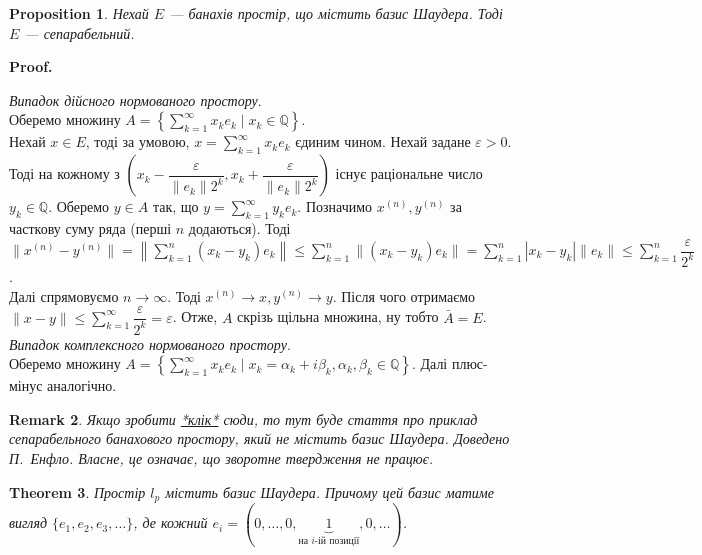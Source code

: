 \documentclass[a4paper, 10pt]{article}
\makeatletter
\theoremstyle{theoremdd}
\newtheorem{theorem}{Theorem}[subsection]
\theoremstyle{theoremdd}
\theoremstyle{theoremdd}
\theoremstyle{theoremdd}
\theoremstyle{theoremdd}
\newtheorem{proposition}[theorem]{Proposition}
\theoremstyle{theoremdd}
\newtheorem{remark}[theorem]{Remark}
\theoremstyle{theoremdd}
\theoremstyle{theoremdd}
\renewenvironment{proof}[1][Proof.\\]{\par
\pushQED{\hfill \qed}%
\normalfont \topsep6\p@\@plus6\p@\relax
\trivlist
\item\relax
{\bfseries
#1\@addpunct{.}}\hspace\labelsep\ignorespaces
}{%
\popQED\endtrivlist\@endpefalse
}
\makeatother
\begin{document}
\begin{proposition}
Нехай $E$ --- банахів простір, що містить базис Шаудера. Тоді $E$ --- сепарабельний.
\end{proposition}

\begin{proof}
\textit{Випадок дійсного нормованого простору}.\\
Оберемо множину $A = \left\{ \displaystyle\sum_{k=1}^\infty x_k e_k \mid x_k \in \mathbb{Q} \right\}$.\\
Нехай $x \in E$, тоді за умовою, $x = \displaystyle\sum_{k=1}^\infty x_k e_k$ єдиним чином. Нехай задане $\varepsilon > 0$. Тоді на кожному з $\left(x_k-\dfrac{\varepsilon}{\|e_k\| 2^k},x_k + \dfrac{\varepsilon}{\|e_k\| 2^k} \right)$ існує раціональне число $y_k \in \mathbb{Q}$. Оберемо $y \in A$ так, що $y = \displaystyle\sum_{k=1}^\infty y_k e_k$. Позначимо $x^{(n)},y^{(n)}$ за часткову суму ряда (перші $n$ додаються). Тоді\\
$\|x^{(n)} - y^{(n)}\| = \displaystyle\left\| \sum_{k=1}^n (x_k-y_k) e_k \right\| \leq \sum_{k=1}^n \| (x_k-y_k) e_k \| = \sum_{k=1}^n |x_k-y_k| \|e_k\| \leq \sum_{k=1}^n \dfrac{\varepsilon}{2^k}$.\\
Далі спрямовуємо $n \to \infty$. Тоді $x^{(n)} \to x, y^{(n)} \to y$. Після чого отримаємо $\|x-y\| \displaystyle \leq \sum_{k=1}^\infty \dfrac{\varepsilon}{2^k} = \varepsilon$. Отже, $A$ скрізь щільна множина, ну тобто $\bar{A} = E$.
\bigskip \\
\textit{Випадок комплексного нормованого простору}.\\
Оберемо множину $A = \left\{ \displaystyle\sum_{k=1}^\infty x_k e_k \mid x_k = \alpha_k + i \beta_k, \alpha_k, \beta_k \in \mathbb{Q} \right\}$. Далі плюс-мінус аналогічно.
\end{proof}

\begin{remark}
Якщо зробити \textcolor{red}{\href{https://projecteuclid.org/download/pdf_1/euclid.acta/1485889774}{*клік*}} сюди, то тут буде стаття про приклад сепарабельного банахового простору, який не містить базис Шаудера. Доведено П.\ Енфло. Власне, це означає, що зворотне твердження не працює.
\end{remark}

\begin{theorem}
Простір $l_p$ містить базис Шаудера. Причому цей базис матиме вигляд $\{e_1,e_2,e_3,\dots\}$, де кожний $e_i = (0,\dots,0,\underbrace{1}_{\text{на $i$-ій позиції}},0,\dots)$.
\end{theorem}
\end{document}
